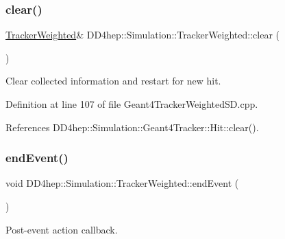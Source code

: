 \hypertarget{struct_d_d4hep_1_1_simulation_1_1_tracker_weighted_a0c6304d5c3a6b0964f7388c3440235db}{}\label{struct_d_d4hep_1_1_simulation_1_1_tracker_weighted_a0c6304d5c3a6b0964f7388c3440235db} 
\subsubsection{\texorpdfstring{clear()}{clear()}}
{\footnotesize\ttfamily \hyperlink{struct_d_d4hep_1_1_simulation_1_1_tracker_weighted}{Tracker\+Weighted}\& D\+D4hep\+::\+Simulation\+::\+Tracker\+Weighted\+::clear (\begin{DoxyParamCaption}{ }\end{DoxyParamCaption})\hspace{0.3cm}{\ttfamily [inline]}}



Clear collected information and restart for new hit. 



Definition at line 107 of file Geant4\+Tracker\+Weighted\+S\+D.\+cpp.



References D\+D4hep\+::\+Simulation\+::\+Geant4\+Tracker\+::\+Hit\+::clear().

\hypertarget{struct_d_d4hep_1_1_simulation_1_1_tracker_weighted_aa489deb875d6f5867917d2b7aae00747}{}\label{struct_d_d4hep_1_1_simulation_1_1_tracker_weighted_aa489deb875d6f5867917d2b7aae00747} 
\subsubsection{\texorpdfstring{end\+Event()}{endEvent()}}
{\footnotesize\ttfamily void D\+D4hep\+::\+Simulation\+::\+Tracker\+Weighted\+::end\+Event (\begin{DoxyParamCaption}{ }\end{DoxyParamCaption})\hspace{0.3cm}{\ttfamily [inline]}}



Post-\/event action callback. 




